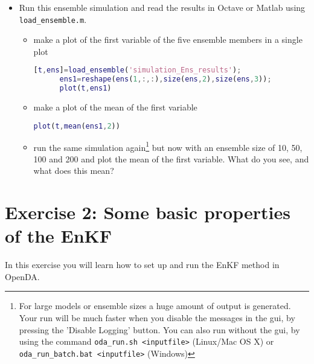 \documentclass[a4paper,10pt]{article}
\begin{document}
\begin{itemize}
\item Run this ensemble simulation and read the results in Octave or
      Matlab using {\tt load\_ensemble.m}.
      \begin{itemize}
      \item make a plot of the first variable of the five ensemble
            members in a single plot
      \begin{lstlisting}[language=Matlab,frame=single,caption={Matlab}]
      [t,ens]=load_ensemble('simulation_Ens_results');
      ens1=reshape(ens(1,:,:),size(ens,2),size(ens,3));
      plot(t,ens1)
      \end{lstlisting}
      \item make a plot of the mean of the first variable
      \begin{lstlisting}[language=Matlab,frame=single,caption={Matlab}]
      plot(t,mean(ens1,2))
      \end{lstlisting}
      \item run the same simulation again\footnote{For large models or
            ensemble sizes a huge amount of output is generated. Your
            run will be much faster when you disable the messages in
            the gui, by pressing the 'Disable Logging' button.
            You can also run without the gui, by using the command
            {\tt oda\_run.sh <inputfile>} (Linux/Mac OS X) or
            {\tt oda\_run\_batch.bat <inputfile>} (Windows)}
            but now with an ensemble size of 10, 50, 100 and 200 and
            plot the mean of the first variable. What do you see, and
            what does this mean?
      \end{itemize}
\end{itemize}

\section{Exercise 2: Some basic properties of the EnKF}

In this exercise you will learn how to set up and run the EnKF method in OpenDA.
\end{document}

